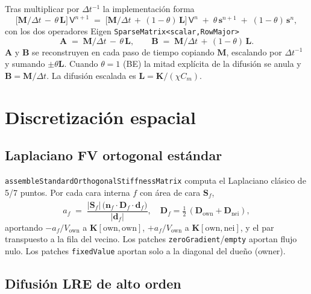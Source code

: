\documentclass[11pt,a4paper]{article}
\newcommand{\code}[1]{\texttt{\small #1}}
\newcommand{\Dten}{\mathbf{D}}
\newcommand{\Mmass}{\mathbf{M}}
\newcommand{\Kstif}{\mathbf{K}}
\newcommand{\Lop}{\mathbf{L}}
\newcommand{\Aimp}{\mathbf{A}}
\newcommand{\Bimp}{\mathbf{B}}
\begin{document}
Tras multiplicar por $\Delta t^{-1}$ la implementación forma
\begin{equation}
  \bigl[\Mmass/\Delta t \,-\, \theta\, \Lop\bigr]\, \mathsf{V}^{n+1}
   \;=\;
   \bigl[\Mmass/\Delta t \,+\, (1-\theta)\, \Lop\bigr]\, \mathsf{V}^{n}
   \;+\; \theta\, \mathbf{s}^{n+1}
   \;+\; (1-\theta)\, \mathbf{s}^{n},
   \label{eq:implicit-system}
\end{equation}
con los dos operadores Eigen \code{SparseMatrix<scalar,RowMajor>}
\begin{equation}
  \Aimp \;=\; \Mmass/\Delta t \,-\, \theta\, \Lop,
   \qquad
  \Bimp \;=\; \Mmass/\Delta t \,+\, (1-\theta)\, \Lop.
   \label{eq:AB}
\end{equation}
$\Aimp$ y $\Bimp$ se reconstruyen en cada paso de tiempo copiando $\Mmass$,
escalando por $\Delta t^{-1}$ y sumando $\pm \theta \Lop$. Cuando
$\theta = 1$ (BE) la mitad explícita de la difusión se anula y
$\Bimp = \Mmass/\Delta t$. La difusión escalada es
$\Lop = \Kstif / (\chi C_{m})$.

\section{Discretización espacial}

\subsection{Laplaciano FV ortogonal estándar}

\code{assembleStandardOrthogonalStiffnessMatrix} computa el Laplaciano clásico de
5/7 puntos. Por cada cara interna $f$ con área de cara $\mathbf{S}_{f}$,
\begin{equation}
  a_{f} \;=\;
   \frac{ \lvert \mathbf{S}_{f} \rvert\,
          \bigl( \mathbf{n}_{f} \cdot \Dten_{f} \cdot \hat{\mathbf{d}}_{f} \bigr) }
        { \lvert \mathbf{d}_{f} \rvert },
   \quad
   \Dten_{f} = \tfrac{1}{2}\,(\Dten_{\text{own}} + \Dten_{\text{nei}}),
\end{equation}
aportando $-a_{f}/V_{\text{own}}$ a $\Kstif[\text{own},\text{own}]$,
$+a_{f}/V_{\text{own}}$ a $\Kstif[\text{own},\text{nei}]$, y el par transpuesto a
la fila del vecino. Los patches \code{zeroGradient}/\code{empty} aportan flujo
nulo. Los patches \code{fixedValue} aportan solo a la diagonal del dueño (owner).

\subsection{Difusión LRE de alto orden}
\end{document}
